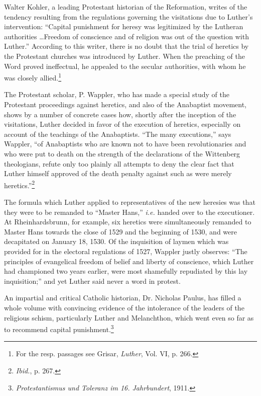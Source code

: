 Walter Kohler, a leading Protestant historian of the Reformation, writes of
the tendency resulting from the regulations governing the visitations due to
Luther’s intervention: “Capital punishment for heresy was legitimized by
the Lutheran authorities \dots Freedom of conscience and of religion was
out of the question with Luther.” According to this writer, there is no doubt
that the trial of heretics by the Protestant churches was introduced by
Luther. When the preaching of the Word proved ineffectual, he appealed
to the secular authorities, with whom he was closely allied.\footnote
{For the resp. passages see Grisar, \textit{Luther}, Vol. VI, p. 266.}

The Protestant scholar, P. Wappler, who has made a special study
of the Protestant proceedings against heretics, and also of the Anabaptist
movement, shows by a number of concrete cases how, shortly after
the inception of the visitations, Luther decided in favor of the execution of
heretics, especially on account of the teachings of the Anabaptists. “The many
executions,” says Wappler, “of Anabaptists who are known not to have
been revolutionaries and who were put to death on the strength of the
declarations of the Wittenberg theologians, refute only too plainly all
attempts to deny the clear fact that Luther himself approved of the death
penalty against such as were merely heretics.”\footnote{\textit{Ibid.}, p. 267.}

The formula which Luther applied to representatives of the new
heresies was that they were to be remanded to “Master Hans,” \textit{i.e.}
handed over to the executioner. At Rheinhardsbrunn, for example,
six heretics were simultaneously remanded to Master Hans towards
the close of 1529 and the beginning of 1530, and were decapitated on
January 18, 1530. Of the inquisition of laymen which was provided
for in the electoral regulations of 1527, Wappler justly observes:
“The principles of evangelical freedom of belief and liberty of conscience,
which Luther had championed two years earlier, were most
shamefully repudiated by this lay inquisition;” and yet Luther said
never a word in protest.

An impartial and critical Catholic historian, Dr. Nicholas Paulus,
has filled a whole volume with convincing evidence of the intolerance
of the leaders of the religious schism, particularly Luther and Melanchthon,
which went even so far as to recommend capital punishment.\footnote{\textit{Protestantismus und Toleranz im 16. Jahrbundert}, 1911.}

